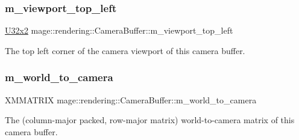 \subsubsection{\texorpdfstring{m\+\_\+viewport\+\_\+top\+\_\+left}{m\_viewport\_top\_left}}
{\footnotesize\ttfamily \hyperlink{namespacemage_a88e05bff0300120c013285d3dcad95c5}{U32x2} mage\+::rendering\+::\+Camera\+Buffer\+::m\+\_\+viewport\+\_\+top\+\_\+left}

The top left corner of the camera viewport of this camera buffer. \hypertarget{structmage_1_1rendering_1_1_camera_buffer_af1ceff883dcc383ce10f2165a5a9a061}{}\label{structmage_1_1rendering_1_1_camera_buffer_af1ceff883dcc383ce10f2165a5a9a061} 
\subsubsection{\texorpdfstring{m\+\_\+world\+\_\+to\+\_\+camera}{m\_world\_to\_camera}}
{\footnotesize\ttfamily X\+M\+M\+A\+T\+R\+IX mage\+::rendering\+::\+Camera\+Buffer\+::m\+\_\+world\+\_\+to\+\_\+camera}

The (column-\/major packed, row-\/major matrix) world-\/to-\/camera matrix of this camera buffer. 